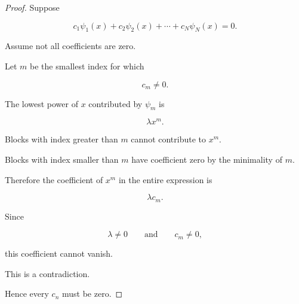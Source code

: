 \begin{proof}

Suppose

\[
c_1\psi_1(x)
+
c_2\psi_2(x)
+\cdots+
c_N\psi_N(x)
=
0.
\]

Assume not all coefficients are zero.

Let \(m\) be the smallest index for which

\[
c_m\neq0.
\]

The lowest power of \(x\) contributed by \(\psi_m\) is

\[
\lambda x^m.
\]

Blocks with index greater than \(m\) cannot contribute to \(x^m\).

Blocks with index smaller than \(m\) have coefficient zero by the
minimality of \(m\).

Therefore the coefficient of \(x^m\) in the entire expression is

\[
\lambda c_m.
\]

Since

\[
\lambda\neq0
\qquad\text{and}\qquad
c_m\neq0,
\]

this coefficient cannot vanish.

This is a contradiction.

Hence every \(c_n\) must be zero.

\end{proof}

